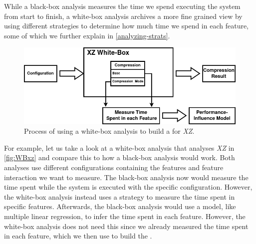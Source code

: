 While a black-box analysis measures the time we spend executing the system from start to finish, 
a white-box analysis archives a more fine grained view by using different strategies to determine how much time we spend in each feature, some of which
we further explain in \autoref{analyzing-strats}.


\begin{figure}[h]
    \centering
    \includegraphics[scale=0.55]{gfx/whitebox_2.png}
    \caption{Process of using a white-box analysis to build a {\perfInfluenceModel} for \textit{XZ}.}
    \label{fig:WBxz}
\end{figure}

For example, let us take a look at a white-box analysis that analyses \textit{XZ} in \autoref{fig:WBxz} and compare this to how a black-box analysis would work.
Both analyses use different configurations containing the features and feature interaction we want to measure. 
The black-box analysis now would measure the time spent while the system is executed with the specific configuration.
However, the white-box analysis instead uses a strategy to measure the time spent in specific features. 
Afterwards, the black-box analysis would use a model, like multiple linear regression, to infer the time spent in each feature. 
However, the white-box analysis does not need this since we already measured the time spent in each feature, which we then use to build the {\perfInfluenceModel}.



